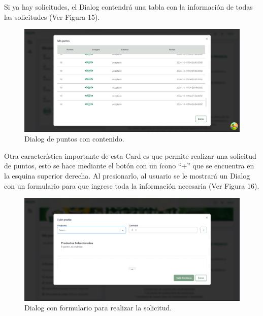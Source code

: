 Si ya hay solicitudes, el Dialog contendrá una tabla con la información de todas las solicitudes (Ver Figura 15).

    \begin{figure}[H]
        \begin{center}
            \includegraphics[scale=0.35]{img/actividades/detalles-campanias/dialog-puntos-contenido.png}
            \caption{Dialog de puntos con contenido.}
            \label{fig:dialog-puntos-contenido}
        \end{center}
    \end{figure}

Otra característica importante de esta Card es que permite realizar una solicitud de puntos, esto se hace mediante el botón con un ícono ``+'' que se encuentra en la esquina superior derecha. Al presionarlo, al usuario se le mostrará un Dialog con un formulario para que ingrese toda la información necesaria (Ver Figura 16).

    \begin{figure}[H]
        \begin{center}
            \includegraphics[scale=0.35]{img/actividades/detalles-campanias/dialof-formulario.png}
            \caption{Dialog con formulario para realizar la solicitud.}
            \label{fig:dialog-solicitud}
        \end{center}
    \end{figure}


